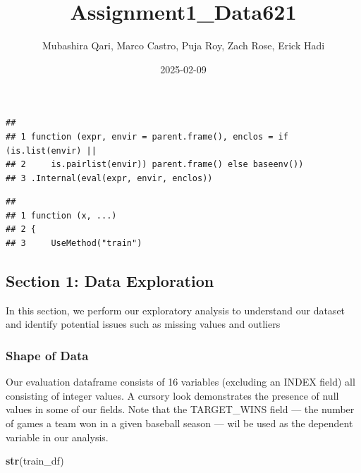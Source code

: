 \documentclass[
]{article}
\title{Assignment1\_Data621}
\author{Mubashira Qari, Marco Castro, Puja Roy, Zach Rose, Erick Hadi}
\date{2025-02-09}
\newenvironment{Shaded}{\begin{snugshade}}{\end{snugshade}}
\newcommand{\FunctionTok}[1]{\textcolor[rgb]{0.13,0.29,0.53}{\textbf{#1}}}
\newcommand{\NormalTok}[1]{#1}
\begin{document}
\maketitle

\begin{verbatim}
##                                                                          
## 1 function (expr, envir = parent.frame(), enclos = if (is.list(envir) || 
## 2     is.pairlist(envir)) parent.frame() else baseenv())                 
## 3 .Internal(eval(expr, envir, enclos))
\end{verbatim}

\begin{verbatim}
##                         
## 1 function (x, ...)     
## 2 {                     
## 3     UseMethod("train")
\end{verbatim}

\subsection{Section 1: Data
Exploration}\label{section-1-data-exploration}

In this section, we perform our exploratory analysis to understand our
dataset and identify potential issues such as missing values and
outliers

\subsubsection{Shape of Data}\label{shape-of-data}

Our evaluation dataframe consists of 16 variables (excluding an INDEX
field) all consisting of integer values. A cursory look demonstrates the
presence of null values in some of our fields. Note that the
TARGET\_WINS field --- the number of games a team won in a given
baseball season --- wil be used as the dependent variable in our
analysis.

\begin{Shaded}
\begin{Highlighting}[]
\FunctionTok{str}\NormalTok{(train\_df)}
\end{Highlighting}
\end{Shaded}
\end{document}
